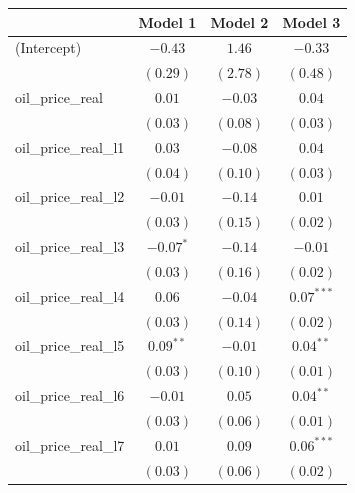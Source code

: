 \documentclass[12pt]{article}
\begin{document}
\begin{table}
\begin{center}
\begin{tabular}{l c c c }
\hline
                                     & Model 1 & Model 2 & Model 3 \\
\hline
(Intercept)                          & $-0.43$       & $1.46$        & $-0.33$       \\
                                     & $(0.29)$      & $(2.78)$      & $(0.48)$      \\
oil_price_real                       & $0.01$        & $-0.03$       & $0.04$        \\
                                     & $(0.03)$      & $(0.08)$      & $(0.03)$      \\
oil_price_real_l1                    & $0.03$        & $-0.08$       & $0.04$        \\
                                     & $(0.04)$      & $(0.10)$      & $(0.03)$      \\
oil_price_real_l2                    & $-0.01$       & $-0.14$       & $0.01$        \\
                                     & $(0.03)$      & $(0.15)$      & $(0.02)$      \\
oil_price_real_l3                    & $-0.07^{*}$   & $-0.14$       & $-0.01$       \\
                                     & $(0.03)$      & $(0.16)$      & $(0.02)$      \\
oil_price_real_l4                    & $0.06$        & $-0.04$       & $0.07^{***}$  \\
                                     & $(0.03)$      & $(0.14)$      & $(0.02)$      \\
oil_price_real_l5                    & $0.09^{**}$   & $-0.01$       & $0.04^{**}$   \\
                                     & $(0.03)$      & $(0.10)$      & $(0.01)$      \\
oil_price_real_l6                    & $-0.01$       & $0.05$        & $0.04^{**}$   \\
                                     & $(0.03)$      & $(0.06)$      & $(0.01)$      \\
oil_price_real_l7                    & $0.01$        & $0.09$        & $0.06^{***}$  \\
                                     & $(0.03)$      & $(0.06)$      & $(0.02)$      \\

\end{tabular}
\end{center}
\end{table}
\end{document}
